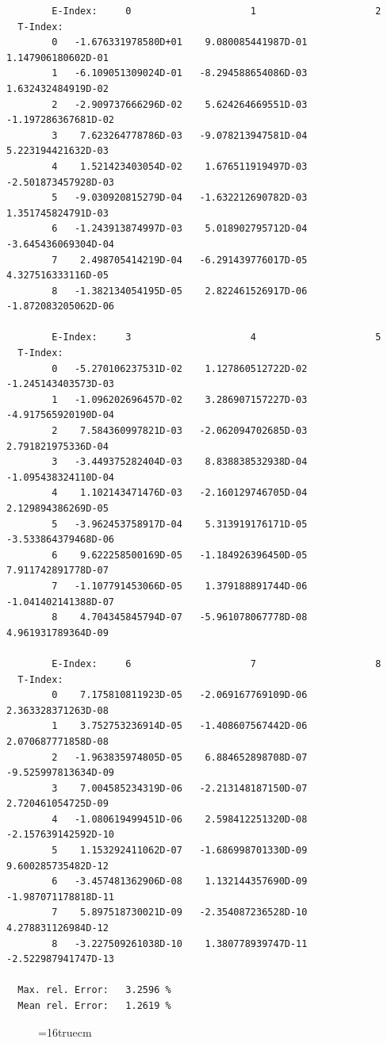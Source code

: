 \documentclass[12pt,dvips]{article}
\begin{document}
\begin{small}\begin{verbatim}
        E-Index:     0                     1                     2
  T-Index:
        0   -1.676331978580D+01    9.080085441987D-01    1.147906180602D-01
        1   -6.109051309024D-01   -8.294588654086D-03    1.632432484919D-02
        2   -2.909737666296D-02    5.624264669551D-03   -1.197286367681D-02
        3    7.623264778786D-03   -9.078213947581D-04    5.223194421632D-03
        4    1.521423403054D-02    1.676511919497D-03   -2.501873457928D-03
        5   -9.030920815279D-04   -1.632212690782D-03    1.351745824791D-03
        6   -1.243913874997D-03    5.018902795712D-04   -3.645436069304D-04
        7    2.498705414219D-04   -6.291439776017D-05    4.327516333116D-05
        8   -1.382134054195D-05    2.822461526917D-06   -1.872083205062D-06

        E-Index:     3                     4                     5
  T-Index:
        0   -5.270106237531D-02    1.127860512722D-02   -1.245143403573D-03
        1   -1.096202696457D-02    3.286907157227D-03   -4.917565920190D-04
        2    7.584360997821D-03   -2.062094702685D-03    2.791821975336D-04
        3   -3.449375282404D-03    8.838838532938D-04   -1.095438324110D-04
        4    1.102143471476D-03   -2.160129746705D-04    2.129894386269D-05
        5   -3.962453758917D-04    5.313919176171D-05   -3.533864379468D-06
        6    9.622258500169D-05   -1.184926396450D-05    7.911742891778D-07
        7   -1.107791453066D-05    1.379188891744D-06   -1.041402141388D-07
        8    4.704345845794D-07   -5.961078067778D-08    4.961931789364D-09

        E-Index:     6                     7                     8
  T-Index:
        0    7.175810811923D-05   -2.069167769109D-06    2.363328371263D-08
        1    3.752753236914D-05   -1.408607567442D-06    2.070687771858D-08
        2   -1.963835974805D-05    6.884652898708D-07   -9.525997813634D-09
        3    7.004585234319D-06   -2.213148187150D-07    2.720461054725D-09
        4   -1.080619499451D-06    2.598412251320D-08   -2.157639142592D-10
        5    1.153292411062D-07   -1.686998701330D-09    9.600285735482D-12
        6   -3.457481362906D-08    1.132144357690D-09   -1.987071178818D-11
        7    5.897518730021D-09   -2.354087236528D-10    4.278831126984D-12
        8   -3.227509261038D-10    1.380778939747D-11   -2.522987941747D-13

  Max. rel. Error:   3.2596 %
  Mean rel. Error:   1.2619 %

\end{verbatim}\end{small}
\begin{figure} \label{2.2.14c}
\epsfxsize=16truecm
\end{figure}
\newpage
\end{document}
